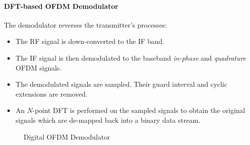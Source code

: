 \paragraph{DFT-based OFDM Demodulator} The demodulator reverses the transmitter's processes:
\begin{itemize}
	\item The \gls{RF} signal is down-converted to the \gls{IF} band.
	\item The \gls{IF} signal is then demodulated to the baseband \emph{in-phase} and \emph{quadrature} \gls{OFDM} signals.
	\item The demodulated signals are sampled. Their guard interval and cyclic extensions are removed.
	\item An \(N\)-point \gls{DFT} is performed on the sampled signals to obtain the original signals which are de-mapped back into a binary data stream.
\end{itemize}
\begin{figure}[!ht]
	\centering
	\resizebox{\textwidth}{!}{
		
	}
	\caption{Digital OFDM Demodulator}
\end{figure}

